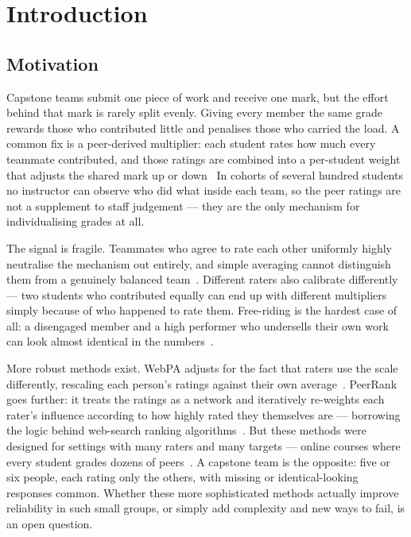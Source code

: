 \chapter{Introduction}
\label{ch:intro}

\section{Motivation}
\label{sec:motivation}

Capstone teams submit one piece of work and receive one mark, but the effort behind that mark is rarely split evenly. Giving every member the same grade rewards those who contributed little and penalises those who carried the load. A common fix is a peer-derived multiplier: each student rates how much every teammate contributed, and those ratings are combined into a per-student weight that adjusts the shared mark up or down~\citep{kaufman2000accounting, loddington2009webpa} In cohorts of
several hundred students no instructor can observe who did what inside each
team, so the peer ratings are not a supplement to staff judgement --- they are
the only mechanism for individualising grades at all.

The signal is fragile.
Teammates who agree to rate each other uniformly highly neutralise the
mechanism out entirely, and simple averaging cannot distinguish them from a genuinely
balanced team~\citep{song2017collusion}. Different raters also calibrate differently — two students who contributed equally can end up with different multipliers simply because of who happened to rate them. Free-riding is the hardest case of all: a disengaged member and a high performer who undersells their own work can look almost identical in the numbers~\citep{hall2013freeriding}.

More robust methods exist. WebPA adjusts for the fact that raters use the scale differently, rescaling each person's ratings against their own average~\citep{loddington2009webpa}. PeerRank goes further: it treats the ratings as a network and iteratively re-weights each rater's influence according to how highly rated they themselves are — borrowing the logic behind web-search ranking algorithms~\citep{walsh2014peerrank, page1999pagerank}. But these methods were designed for settings with many raters and many targets — online courses where every student grades dozens of peers~\citep{piech2013tuned}. A capstone team is the opposite: five or six people, each rating only the others, with missing or identical-looking responses common. Whether these more sophisticated methods actually improve reliability in such small groups, or simply add complexity and new ways to fail, is an open question.

